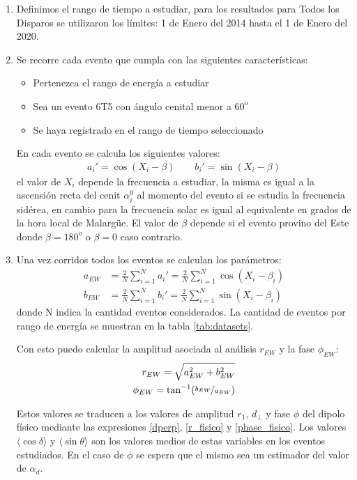 \begin{enumerate}
    \item Definimos el rango de tiempo a estudiar, para los resultados para Todos los Disparos se utilizaron los límites: 1 de Enero del 2014 hasta el 1 de Enero del 2020.
    \item Se recorre cada evento que cumpla con las siguientes características:
     \begin{itemize}
        \item Pertenezca el rango de energía a estudiar
        \item Sea un evento 6T5 con ángulo cenital menor a $60^o$
        \item Se haya registrado en el rango de tiempo seleccionado
    \end{itemize}
    En cada evento se calcula los siguientes valores:
    \begin{align}
        a_i' = \cos(X_i - \beta) \qquad
        b_i' = \sin(X_i - \beta)
    \end{align}
    el valor de $X_i$ depende la frecuencia a estudiar, la misma es igual a la ascensión recta del cenit $\alpha^0_i$ al momento del evento  si se estudia la frecuencia sidérea, en cambio para la frecuencia solar es igual al equivalente en grados de la hora local de Malargüe. El valor de $\beta$ depende si el evento provino del Este donde $\beta=180^o$ o $\beta=0$ caso contrario.
    
    \item Una vez corridos todos los  eventos se calculan los parámetros:
    \begin{align*}
        a_{EW} &= \frac{2}{N} \sum^N_{i=1}a_i' =\frac{2}{N} \sum^N_{i=1} \cos(X_i - \beta_i)\\
        b_{EW} &= \frac{2}{N} \sum^N_{i=1}b_i' =\frac{2}{N} \sum^N_{i=1} \sin(X_i - \beta_i)
    \end{align*}
    donde N indica la cantidad eventos considerados. La cantidad de eventos por rango de energía se muestran en la tabla \ref{tab:datasets}.

    Con esto puedo calcular la amplitud asociada al análisis $r_{EW}$ y la fase $\phi_{EW}$:
    \begin{align*}
        r_{EW} = \sqrt{a_{EW}^2 + b_{EW}^2}\\
        \phi_{EW} = \tan^{-1}(\nicefrac{b_{EW}}{a_{EW}})
    \end{align*}

    Estos valores se traducen a los valores de amplitud $r_1$, $d_\perp$ y fase $\phi$ del dipolo físico mediante las expresiones \ref{dperp}, \ref{r_fisico} y \ref{phase_fisico}.   Los valores $\langle\cos\delta \rangle$ y $\langle\sin\theta \rangle$ son los valores medios de estas variables en los eventos estudiados. En el caso de $\phi$ se espera que el mismo sea un estimador del valor de $\alpha_d$.


\end{enumerate}
